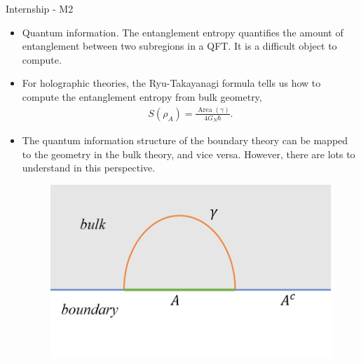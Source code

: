\documentclass{beamer}
\newcommand{\g}{\gamma}
\renewcommand{\r}{\rho}
\newcommand{\hb}{\hbar}
\newcommand{\zt}{\operatorname}
\newcommand{\eq}[1]{\begin{equation}\begin{aligned}{}#1\end{aligned}\end{equation}}
\begin{document}
\begin{frame}{Internship - M2}
\begin{itemize}

\item Quantum information. The entanglement entropy quantifies the amount of entanglement between two subregions in a QFT.
It is a difficult object to compute.

\item For holographic theories, the Ryu-Takayanagi formula tells us how to compute the entanglement entropy from bulk geometry,
\eq{S(\r_A)=\frac{\zt{Area}(\g)}{4G_N\hb}.}

\item The quantum information structure of the boundary theory can be mapped to the geometry in the bulk theory, and vice versa.
However, there are lots to understand in this perspective.

\begin{figure}[htb]
    \centering
    \includegraphics[scale=0.4]{Figures/RT formula.png}
\end{figure}

\end{itemize}
\end{frame}
\end{document}
